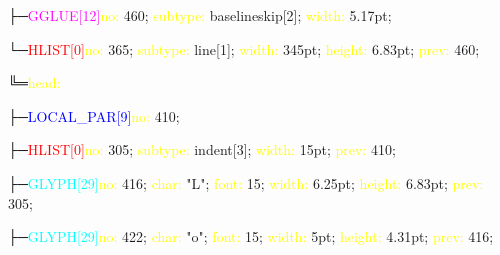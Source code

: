 \documentclass{article}
\begin{document}
\begin{nodetreeexample}
  ├─\textcolor{magenta}{GGLUE[12]\hspace{1em}}\textcolor{yellow}{no:} 460; \textcolor{yellow}{subtype:} baselineskip[2]; \textcolor{yellow}{width:} 5.17pt; \par
  └─\textcolor{red}{HLIST[0]\hspace{1em}}\textcolor{yellow}{no:} 365; \textcolor{yellow}{subtype:} line[1]; \textcolor{yellow}{width:} 345pt; \textcolor{yellow}{height:} 6.83pt; \textcolor{yellow}{prev:} 460; \par
  \hspace{1em}\hspace{1em}╚═\textcolor{yellow}{head:}\par
  \hspace{1em}\hspace{1em}\hspace{1em}\hspace{1em}├─\textcolor{blue}{LOCAL\_PAR[9]\hspace{1em}}\textcolor{yellow}{no:} 410; \par
  \hspace{1em}\hspace{1em}\hspace{1em}\hspace{1em}├─\textcolor{red}{HLIST[0]\hspace{1em}}\textcolor{yellow}{no:} 305; \textcolor{yellow}{subtype:} indent[3]; \textcolor{yellow}{width:} 15pt; \textcolor{yellow}{prev:} 410; \par
  \hspace{1em}\hspace{1em}\hspace{1em}\hspace{1em}├─\textcolor{cyan}{GLYPH[29]\hspace{1em}}\textcolor{yellow}{no:} 416; \textcolor{yellow}{char:} "L"; \textcolor{yellow}{font:} 15; \textcolor{yellow}{width:} 6.25pt; \textcolor{yellow}{height:} 6.83pt; \textcolor{yellow}{prev:} 305; \par
  \hspace{1em}\hspace{1em}\hspace{1em}\hspace{1em}├─\textcolor{cyan}{GLYPH[29]\hspace{1em}}\textcolor{yellow}{no:} 422; \textcolor{yellow}{char:} "o"; \textcolor{yellow}{font:} 15; \textcolor{yellow}{width:} 5pt; \textcolor{yellow}{height:} 4.31pt; \textcolor{yellow}{prev:} 416; \par

\end{nodetreeexample}
\end{document}
